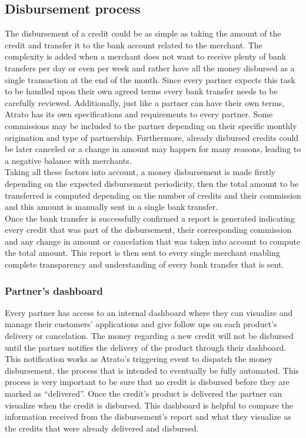 \subsection{Disbursement process}
The disbursement of a credit could be as simple as taking the amount of the credit and transfer it to the bank account related to the merchant. The complexity is added when a merchant does not want to receive plenty of bank transfers per day or even per week and rather have all the money disbursed as a single transaction at the end of the month. Since every partner expects this task to be handled upon their own agreed terms every bank transfer needs to be carefully reviewed. Additionally, just like a partner can have their own terms, Atrato has its own specifications and requirements to every partner. Some commissions may be included to the partner depending on their specific monthly origination and type of partnership. Furthermore, already disbursed credits could be later canceled or a change in amount may happen for many reasons, leading to a negative balance with merchants.\\

Taking all these factors into account, a money disbursement is made firstly depending on the expected disbursement periodicity, then the total amount to be transferred is computed depending on the number of credits and their commission and this amount is manually sent in a single bank transfer.\\

Once the bank transfer is successfully confirmed a report is generated indicating every credit that was part of the disbursement, their corresponding commission and any change in amount or cancelation that was taken into account to compute the total amount. This report is then sent to every single merchant enabling complete transparency and understanding of every bank transfer that is sent.
\subsubsection{Partner’s dashboard}
Every partner has access to an internal dashboard where they can visualize and manage their customers’ applications and give follow ups on each product’s delivery or cancelation. The money regarding a new credit will not be disbursed until the partner notifies the delivery of the product through their dashboard. This notification works as Atrato’s triggering event to dispatch the money disbursement, the process that is intended to eventually be fully automated. This process is very important to be sure that no credit is disbursed before they are marked as “delivered”. Once the credit’s product is delivered the partner can visualize when the credit is disbursed. This dashboard is helpful to compare the information received from the disbursement’s report and what they visualize as the credits that were already delivered and disbursed.

